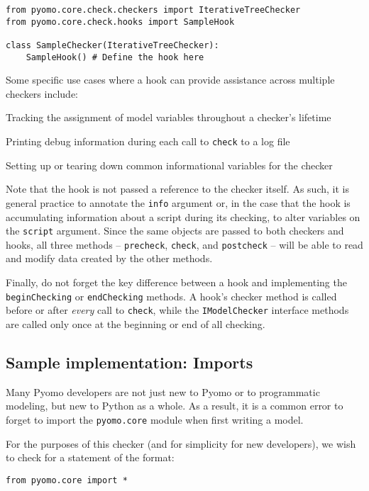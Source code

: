 \documentclass{article}
\begin{document}
\begin{verbatim}
from pyomo.core.check.checkers import IterativeTreeChecker
from pyomo.core.check.hooks import SampleHook

class SampleChecker(IterativeTreeChecker):
    SampleHook() # Define the hook here
\end{verbatim}

Some specific use cases where a hook can provide assistance across multiple checkers include:

\begin{itemize*}
\item Tracking the assignment of model variables throughout a checker's lifetime
\item Printing debug information during each call to \verb!check! to a log file
\item Setting up or tearing down common informational variables for the checker
\end{itemize*}

Note that the hook is not passed a reference to the checker itself. As such, it is general practice to annotate the \verb!info! argument or, in the case that the hook is accumulating information about a script during its checking, to alter variables on the \verb!script! argument. Since the same objects are passed to both checkers and hooks, all three methods -- \verb!precheck!, \verb!check!, and \verb!postcheck! -- will be able to read and modify data created by the other methods.

Finally, do not forget the key difference between a hook and implementing the \verb!beginChecking! or \verb!endChecking! methods. A hook's checker method is called before or after \textit{every} call to \verb!check!, while the \verb!IModelChecker! interface methods are called only once at the beginning or end of all checking.

\subsection*{Sample implementation: Imports}
Many Pyomo developers are not just new to Pyomo or to programmatic modeling, but new to Python as a whole. As a result, it is a common error to forget to import the \verb!pyomo.core! module when first writing a model.

For the purposes of this checker (and for simplicity for new developers), we wish to check for a statement of the format:

\begin{verbatim}
from pyomo.core import *
\end{verbatim}
\end{document}
